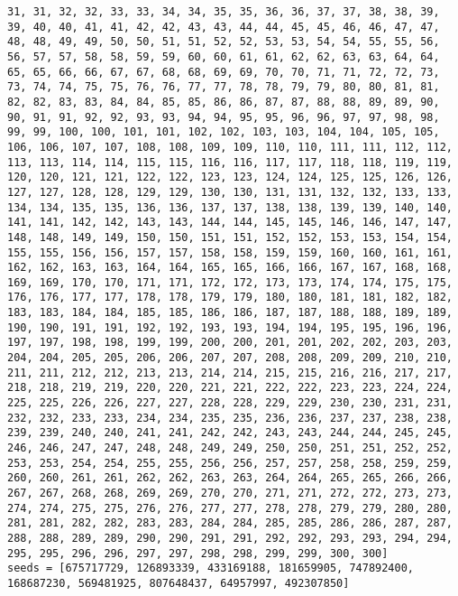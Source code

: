 \begin{lstlisting}[label={lst:call300vehicle90},caption=Optimal solution call\_300\_vehicle\_90]
31, 31, 32, 32, 33, 33, 34, 34, 35, 35, 36, 36, 37, 37, 38, 38, 39, 39, 40, 40, 41, 41, 42, 42, 43, 43, 44, 44, 45, 45, 46, 46, 47, 47, 48, 48, 49, 49, 50, 50, 51, 51, 52, 52, 53, 53, 54, 54, 55, 55, 56, 56, 57, 57, 58, 58, 59, 59, 60, 60, 61, 61, 62, 62, 63, 63, 64, 64, 65, 65, 66, 66, 67, 67, 68, 68, 69, 69, 70, 70, 71, 71, 72, 72, 73, 73, 74, 74, 75, 75, 76, 76, 77, 77, 78, 78, 79, 79, 80, 80, 81, 81, 82, 82, 83, 83, 84, 84, 85, 85, 86, 86, 87, 87, 88, 88, 89, 89, 90, 90, 91, 91, 92, 92, 93, 93, 94, 94, 95, 95, 96, 96, 97, 97, 98, 98, 99, 99, 100, 100, 101, 101, 102, 102, 103, 103, 104, 104, 105, 105, 106, 106, 107, 107, 108, 108, 109, 109, 110, 110, 111, 111, 112, 112, 113, 113, 114, 114, 115, 115, 116, 116, 117, 117, 118, 118, 119, 119, 120, 120, 121, 121, 122, 122, 123, 123, 124, 124, 125, 125, 126, 126, 127, 127, 128, 128, 129, 129, 130, 130, 131, 131, 132, 132, 133, 133, 134, 134, 135, 135, 136, 136, 137, 137, 138, 138, 139, 139, 140, 140, 141, 141, 142, 142, 143, 143, 144, 144, 145, 145, 146, 146, 147, 147, 148, 148, 149, 149, 150, 150, 151, 151, 152, 152, 153, 153, 154, 154, 155, 155, 156, 156, 157, 157, 158, 158, 159, 159, 160, 160, 161, 161, 162, 162, 163, 163, 164, 164, 165, 165, 166, 166, 167, 167, 168, 168, 169, 169, 170, 170, 171, 171, 172, 172, 173, 173, 174, 174, 175, 175, 176, 176, 177, 177, 178, 178, 179, 179, 180, 180, 181, 181, 182, 182, 183, 183, 184, 184, 185, 185, 186, 186, 187, 187, 188, 188, 189, 189, 190, 190, 191, 191, 192, 192, 193, 193, 194, 194, 195, 195, 196, 196, 197, 197, 198, 198, 199, 199, 200, 200, 201, 201, 202, 202, 203, 203, 204, 204, 205, 205, 206, 206, 207, 207, 208, 208, 209, 209, 210, 210, 211, 211, 212, 212, 213, 213, 214, 214, 215, 215, 216, 216, 217, 217, 218, 218, 219, 219, 220, 220, 221, 221, 222, 222, 223, 223, 224, 224, 225, 225, 226, 226, 227, 227, 228, 228, 229, 229, 230, 230, 231, 231, 232, 232, 233, 233, 234, 234, 235, 235, 236, 236, 237, 237, 238, 238, 239, 239, 240, 240, 241, 241, 242, 242, 243, 243, 244, 244, 245, 245, 246, 246, 247, 247, 248, 248, 249, 249, 250, 250, 251, 251, 252, 252, 253, 253, 254, 254, 255, 255, 256, 256, 257, 257, 258, 258, 259, 259, 260, 260, 261, 261, 262, 262, 263, 263, 264, 264, 265, 265, 266, 266, 267, 267, 268, 268, 269, 269, 270, 270, 271, 271, 272, 272, 273, 273, 274, 274, 275, 275, 276, 276, 277, 277, 278, 278, 279, 279, 280, 280, 281, 281, 282, 282, 283, 283, 284, 284, 285, 285, 286, 286, 287, 287, 288, 288, 289, 289, 290, 290, 291, 291, 292, 292, 293, 293, 294, 294, 295, 295, 296, 296, 297, 297, 298, 298, 299, 299, 300, 300]
seeds = [675717729, 126893339, 433169188, 181659905, 747892400, 168687230, 569481925, 807648437, 64957997, 492307850]
\end{lstlisting}
\clearpage


